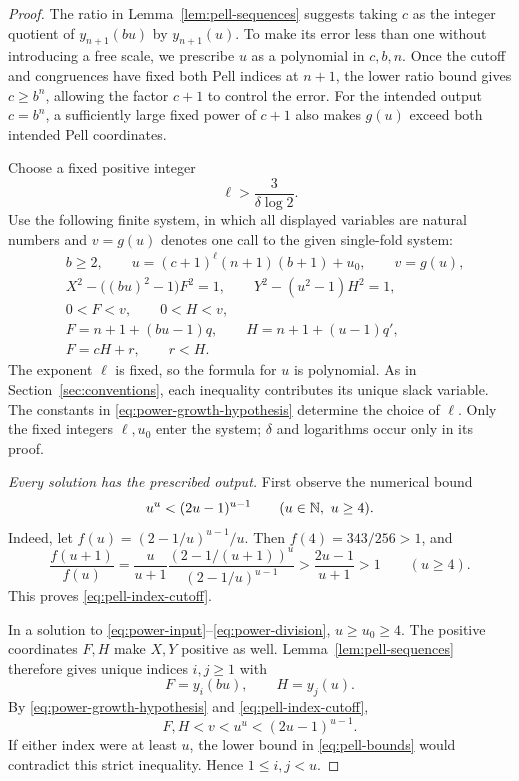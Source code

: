 \begin{proof}
The ratio in Lemma~\ref{lem:pell-sequences} suggests taking $c$ as the
integer quotient of $y_{n+1}(bu)$ by $y_{n+1}(u)$. To make its error
less than one without introducing a free scale, we prescribe $u$ as a
polynomial in $c,b,n$. Once the cutoff and congruences have fixed both
Pell indices at $n+1$, the lower ratio bound gives $c\ge b^n$, allowing
the factor $c+1$ to control the error. For the intended output $c=b^n$,
a sufficiently large fixed power of $c+1$ also makes $g(u)$ exceed both
intended Pell coordinates.

Choose a fixed positive integer
\begin{equation}\label{eq:power-ell}
 \ell>\frac3{\delta\log2}.
\end{equation}
Use the following finite system, in which all displayed variables are
natural numbers and $v=g(u)$ denotes one call to the given single-fold
system:
\begin{align}
 &b\ge2,\qquad
 u=(c+1)^\ell(n+1)(b+1)+u_0,\qquad v=g(u),
       \label{eq:power-input}\\
 &X^2-\bigl((bu)^2-1\bigr)F^2=1,\qquad
 Y^2-(u^2-1)H^2=1,                         \label{eq:power-pell}\\
 &0<F<v,\qquad 0<H<v,                     \label{eq:power-cutoff}\\
 &F=n+1+(bu-1)q,\qquad H=n+1+(u-1)q',      \label{eq:power-residue}\\
 &F=cH+r,\qquad r<H.                      \label{eq:power-division}
\end{align}
The exponent $\ell$ is fixed, so the formula for $u$ is polynomial.
As in Section~\ref{sec:conventions}, each inequality contributes its
unique slack variable.  The constants in
\eqref{eq:power-growth-hypothesis} determine the choice of $\ell$.
Only the fixed integers $\ell,u_0$ enter the system; $\delta$ and
logarithms occur only in its proof.

\smallskip
\noindent\emph{Every solution has the prescribed output.}
First observe the numerical bound
\begin{equation}\label{eq:pell-index-cutoff}
 u^u<(2u-1)^{u-1}\qquad(u\in\mathbb N,\ u\ge4).
\end{equation}
Indeed, let $f(u)=(2-1/u)^{u-1}/u$.  Then $f(4)=343/256>1$, and
\[
 \frac{f(u+1)}{f(u)}
 =\frac u{u+1}
   \frac{(2-1/(u+1))^u}{(2-1/u)^{u-1}}
 >\frac{2u-1}{u+1}>1\qquad(u\ge4).
\]
This proves \eqref{eq:pell-index-cutoff}.

In a solution to \eqref{eq:power-input}--\eqref{eq:power-division},
$u\ge u_0\ge4$.  The positive coordinates $F,H$ make $X,Y$ positive
as well.  Lemma~\ref{lem:pell-sequences} therefore gives unique
indices $i,j\ge1$ with
\[
 F=y_i(bu),\qquad H=y_j(u).
\]
By \eqref{eq:power-growth-hypothesis} and
\eqref{eq:pell-index-cutoff},
\[
 F,H<v<u^u<(2u-1)^{u-1}.
\]
If either index were at least $u$, the lower bound in
\eqref{eq:pell-bounds} would contradict this strict inequality.
Hence $1\le i,j<u$.


\end{proof}
